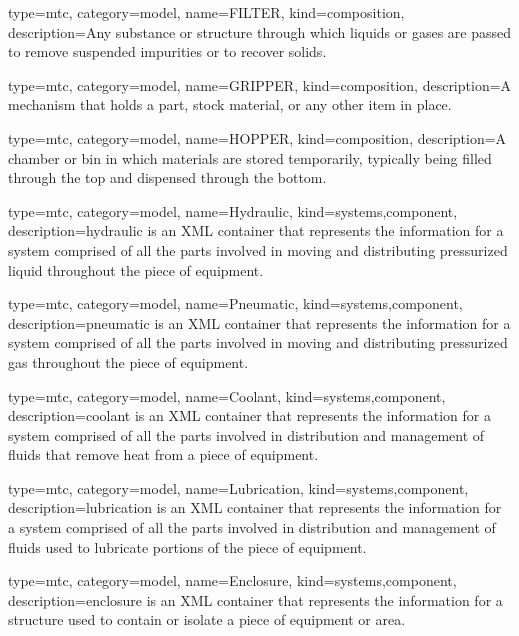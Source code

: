 {
  type=mtc,
  category=model,
  name={FILTER},
  kind={composition},
  description={Any substance or structure through which liquids or gases are passed to remove suspended impurities or to recover solids.}
}


{
  type=mtc,
  category=model,
  name={GRIPPER},
  kind={composition},
  description={A mechanism that holds a part, stock material, or any other item in place.}
}


{
  type=mtc,
  category=model,
  name={HOPPER},
  kind={composition},
  description={A chamber or bin in which materials are stored temporarily, typically being filled through the top and dispensed through the bottom.}
}


{
  type=mtc,
  category=model,
  name={Hydraulic},
  kind={systems,component},
  description={\gls{hydraulic} is an XML container that represents the information for a system comprised of all the parts involved in moving and distributing pressurized liquid throughout the piece of equipment.}
}


{
  type=mtc,
  category=model,
  name={Pneumatic},
  kind={systems,component},
  description={\gls{pneumatic} is an XML container that represents the information for a system comprised of all the parts involved in moving and distributing pressurized gas throughout the piece of equipment.}
}


{
  type=mtc,
  category=model,
  name={Coolant},
  kind={systems,component},
  description={\gls{coolant} is an XML container that represents the information for a system comprised of all the parts involved in distribution and management of fluids that remove heat from a piece of equipment.}
}


{
  type=mtc,
  category=model,
  name={Lubrication},
  kind={systems,component},
  description={\gls{lubrication} is an XML container that represents the information for a system comprised of all the parts involved in distribution and management of fluids used to lubricate portions of the piece of equipment.}
}


{
  type=mtc,
  category=model,
  name={Enclosure},
  kind={systems,component},
  description={\gls{enclosure} is an XML container that represents the information for a structure used to contain or isolate a piece of equipment or area.}
}


